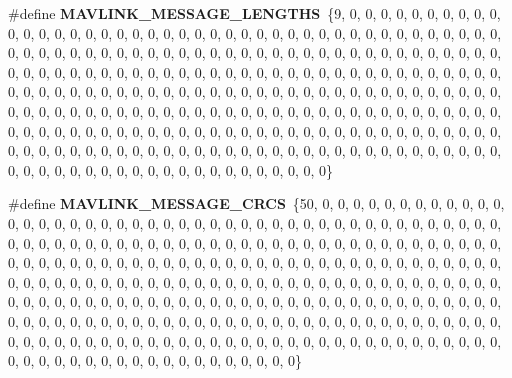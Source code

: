 \begin{DoxyCompactItemize}
\item 
\#define \textbf{ M\+A\+V\+L\+I\+N\+K\+\_\+\+M\+E\+S\+S\+A\+G\+E\+\_\+\+L\+E\+N\+G\+T\+HS}~\{9, 0, 0, 0, 0, 0, 0, 0, 0, 0, 0, 0, 0, 0, 0, 0, 0, 0, 0, 0, 0, 0, 0, 0, 0, 0, 0, 0, 0, 0, 0, 0, 0, 0, 0, 0, 0, 0, 0, 0, 0, 0, 0, 0, 0, 0, 0, 0, 0, 0, 0, 0, 0, 0, 0, 0, 0, 0, 0, 0, 0, 0, 0, 0, 0, 0, 0, 0, 0, 0, 0, 0, 0, 0, 0, 0, 0, 0, 0, 0, 0, 0, 0, 0, 0, 0, 0, 0, 0, 0, 0, 0, 0, 0, 0, 0, 0, 0, 0, 0, 0, 0, 0, 0, 0, 0, 0, 0, 0, 0, 0, 0, 0, 0, 0, 0, 0, 0, 0, 0, 0, 0, 0, 0, 0, 0, 0, 0, 0, 0, 0, 0, 0, 0, 0, 0, 0, 0, 0, 0, 0, 0, 0, 0, 0, 0, 0, 0, 0, 0, 0, 0, 0, 0, 0, 0, 0, 0, 0, 0, 0, 0, 0, 0, 0, 0, 0, 0, 0, 0, 0, 0, 0, 0, 0, 0, 0, 0, 0, 0, 0, 0, 0, 0, 0, 0, 0, 0, 0, 0, 0, 0, 0, 0, 0, 0, 0, 0, 0, 0, 0, 0, 0, 0, 0, 0, 0, 0, 0, 0, 0, 0, 0, 0, 0, 0, 0, 0, 0, 0, 0, 0, 0, 0, 0, 0, 0, 0, 0, 0, 0, 0, 0, 0, 0, 0, 0, 0, 0, 0, 0, 0, 0, 0, 0, 0, 0, 0, 0, 0, 0, 0, 0, 0, 0, 0\}
\item 
\#define \textbf{ M\+A\+V\+L\+I\+N\+K\+\_\+\+M\+E\+S\+S\+A\+G\+E\+\_\+\+C\+R\+CS}~\{50, 0, 0, 0, 0, 0, 0, 0, 0, 0, 0, 0, 0, 0, 0, 0, 0, 0, 0, 0, 0, 0, 0, 0, 0, 0, 0, 0, 0, 0, 0, 0, 0, 0, 0, 0, 0, 0, 0, 0, 0, 0, 0, 0, 0, 0, 0, 0, 0, 0, 0, 0, 0, 0, 0, 0, 0, 0, 0, 0, 0, 0, 0, 0, 0, 0, 0, 0, 0, 0, 0, 0, 0, 0, 0, 0, 0, 0, 0, 0, 0, 0, 0, 0, 0, 0, 0, 0, 0, 0, 0, 0, 0, 0, 0, 0, 0, 0, 0, 0, 0, 0, 0, 0, 0, 0, 0, 0, 0, 0, 0, 0, 0, 0, 0, 0, 0, 0, 0, 0, 0, 0, 0, 0, 0, 0, 0, 0, 0, 0, 0, 0, 0, 0, 0, 0, 0, 0, 0, 0, 0, 0, 0, 0, 0, 0, 0, 0, 0, 0, 0, 0, 0, 0, 0, 0, 0, 0, 0, 0, 0, 0, 0, 0, 0, 0, 0, 0, 0, 0, 0, 0, 0, 0, 0, 0, 0, 0, 0, 0, 0, 0, 0, 0, 0, 0, 0, 0, 0, 0, 0, 0, 0, 0, 0, 0, 0, 0, 0, 0, 0, 0, 0, 0, 0, 0, 0, 0, 0, 0, 0, 0, 0, 0, 0, 0, 0, 0, 0, 0, 0, 0, 0, 0, 0, 0, 0, 0, 0, 0, 0, 0, 0, 0, 0, 0, 0, 0, 0, 0, 0, 0, 0, 0, 0, 0, 0, 0, 0, 0, 0, 0, 0, 0, 0, 0\}
\item 

\end{DoxyCompactItemize}
